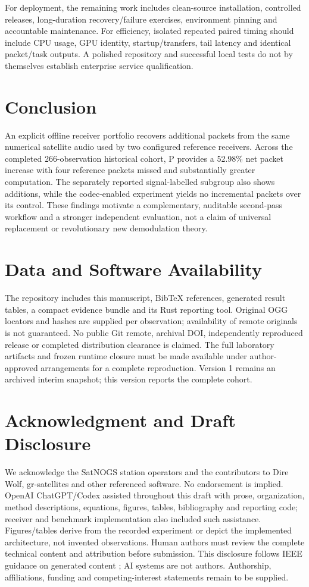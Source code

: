 \documentclass[journal]{IEEEtran}
\begin{document}
For deployment, the remaining work includes clean-source installation, controlled releases, long-duration recovery/failure exercises, environment pinning and accountable maintenance. For efficiency, isolated repeated paired timing should include CPU usage, GPU identity, startup/transfers, tail latency and identical packet/task outputs. A polished repository and successful local tests do not by themselves establish enterprise service qualification.

\section{Conclusion}
An explicit offline receiver portfolio recovers additional packets from the same numerical satellite audio used by two configured reference receivers. Across the completed 266-observation historical cohort, P provides a 52.98\% net packet increase with four reference packets missed and substantially greater computation. The separately reported signal-labelled subgroup also shows additions, while the codec-enabled experiment yields no incremental packets over its control. These findings motivate a complementary, auditable second-pass workflow and a stronger independent evaluation, not a claim of universal replacement or revolutionary new demodulation theory.

\section*{Data and Software Availability}
The repository includes this manuscript, BibTeX references, generated result tables, a compact evidence bundle and its Rust reporting tool. Original OGG locators and hashes are supplied per observation; availability of remote originals is not guaranteed. No public Git remote, archival DOI, independently reproduced release or completed distribution clearance is claimed. The full laboratory artifacts and frozen runtime closure must be made available under author-approved arrangements for a complete reproduction. Version 1 remains an archived interim snapshot; this version reports the complete cohort.

\section*{Acknowledgment and Draft Disclosure}
We acknowledge the SatNOGS station operators and the contributors to Dire Wolf, gr-satellites and other referenced software. No endorsement is implied. OpenAI ChatGPT/Codex assisted throughout this draft with prose, organization, method descriptions, equations, figures, tables, bibliography and reporting code; receiver and benchmark implementation also included such assistance. Figures/tables derive from the recorded experiment or depict the implemented architecture, not invented observations. Human authors must review the complete technical content and attribution before submission. This disclosure follows IEEE guidance on generated content \cite{ieeeguidance}; AI systems are not authors. Authorship, affiliations, funding and competing-interest statements remain to be supplied.



\end{document}
